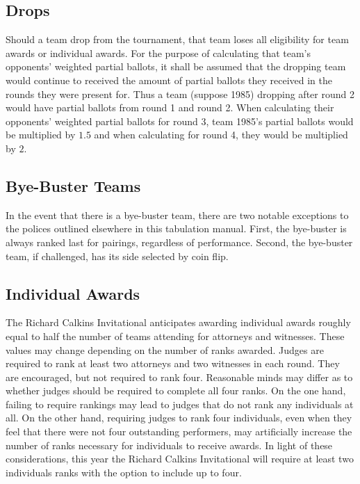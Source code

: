 \documentclass{article}
\begin{document}
\subsection{Drops}
Should a team drop from the tournament, that team loses all eligibility for team awards or individual awards.  For the purpose of calculating that team's opponents' weighted partial ballots, it shall be assumed that the dropping team would continue to received the amount of partial ballots they received in the rounds they were present for.  Thus a team (suppose 1985) dropping after round 2 would have partial ballots from round 1 and round 2.  When calculating their opponents' weighted partial ballots for round 3, team 1985's partial ballots would be multiplied by $1.5$ and when calculating for round 4, they would be multiplied by $2$.
\subsection{Bye-Buster Teams}
In the event that there is a bye-buster team, there are two notable exceptions to the polices outlined elsewhere in this tabulation manual.  First, the bye-buster is always ranked last for pairings, regardless of performance.  Second, the bye-buster team, if challenged, has its side selected by coin flip.
\subsection{Individual Awards}
The Richard Calkins Invitational anticipates awarding individual awards roughly equal to half the number of teams attending for attorneys and witnesses.  These values may change depending on the number of ranks awarded.  Judges are required to rank at least two attorneys and two witnesses in each round.  They are encouraged, but not required to rank four.  Reasonable minds may differ as to whether judges should be required to complete all four ranks.  On the one hand, failing to require rankings may lead to judges that do not rank any individuals at all.  On the other hand, requiring judges to rank four individuals, even when they feel that there were not four outstanding performers, may artificially increase the number of ranks necessary for individuals to receive awards.  In light of these considerations, this year the Richard Calkins Invitational will require at least two individuals ranks with the option to include up to four.
\end{document}
